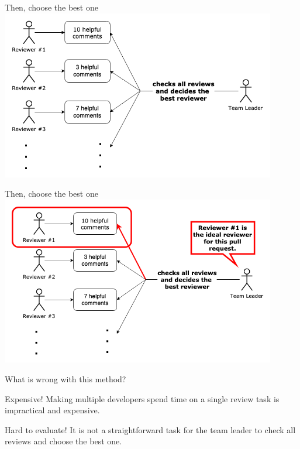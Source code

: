 \documentclass{beamer}
\begin{document}
    \begin{frame}[noframenumbering]{Then, choose the best one}
        \centering\includegraphics[width=0.9\textwidth]{img/multiple_review_2.png}
    \end{frame}

    \begin{frame}[noframenumbering]{Then, choose the best one}
        \centering\includegraphics[width=0.9\textwidth]{img/multiple_review_3.png}
    \end{frame}
    
    \begin{frame}[noframenumbering]{What is wrong with this method?}
    \begin{alertblock}{Expensive!}
        Making multiple developers spend time on a single review task is impractical and expensive.
    \end{alertblock}
    \pause
    \begin{alertblock}{Hard to evaluate!}
        It is not a straightforward task for the team leader to check all reviews and choose the best one.
    \end{alertblock} 
    \end{frame}
    
\end{document}
